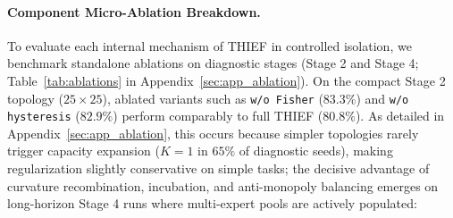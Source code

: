 \paragraph{Component Micro-Ablation Breakdown.}
To evaluate each internal mechanism of THIEF in controlled isolation, we benchmark standalone ablations on diagnostic stages (Stage 2 and Stage 4; Table~\ref{tab:ablations} in Appendix~\ref{sec:app_ablation}). On the compact Stage 2 topology ($25 \times 25$), ablated variants such as \texttt{w/o Fisher} ($83.3\%$) and \texttt{w/o hysteresis} ($82.9\%$) perform comparably to full THIEF ($80.8\%$). As detailed in Appendix~\ref{sec:app_ablation}, this occurs because simpler topologies rarely trigger capacity expansion ($K=1$ in $65\%$ of diagnostic seeds), making regularization slightly conservative on simple tasks; the decisive advantage of curvature recombination, incubation, and anti-monopoly balancing emerges on long-horizon Stage 4 runs where multi-expert pools are actively populated:
